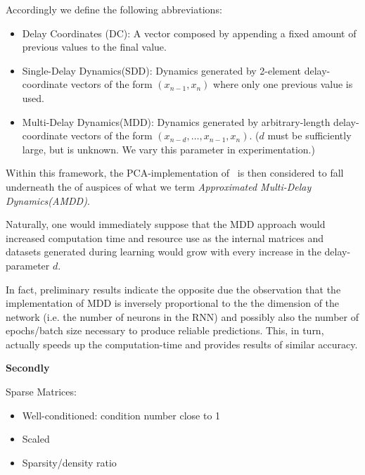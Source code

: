 \documentclass[a4paper,12pt,twoside]{report}
\begin{document}
Accordingly we define the following abbreviations:
\begin{itemize}
  \item Delay Coordinates (DC): A vector composed by appending a fixed amount of previous values to the final value.
  \item Single-Delay Dynamics(SDD): Dynamics generated by 2-element delay-coordinate vectors of the form $(x_{n-1}, x_n)$ where only one previous value is used.
  \item Multi-Delay Dynamics(MDD): Dynamics generated by arbitrary-length delay-coordinate vectors of the form $(x_{n-d}, \ldots , x_{n-1}, x_{n})$. ($d$ must be sufficiently large, but is unknown. We vary this parameter in experimentation.)
\end{itemize}

Within this framework, the PCA-implementation of~\cite{manjunath2021universal} is then considered to fall underneath the of auspices of what we term \emph{Approximated Multi-Delay Dynamics(AMDD)}.


Naturally, one would immediately suppose that the MDD approach would increased computation time and resource use as the internal matrices and datasets generated during learning would grow with every increase in the delay-parameter $d$. 

In fact, preliminary results indicate the opposite due the observation that the implementation of MDD is inversely proportional to the the dimension of the network (i.e. the number of neurons in the RNN) and possibly also the number of epochs/batch size necessary to produce reliable predictions. 
This, in turn, actually speeds up the computation-time and provides results of similar accuracy. 

\textbf{Secondly}

Sparse Matrices:
\vspace{-8mm}
\begin{itemize}[noitemsep]
\item Well-conditioned: condition number close to 1
\item Scaled
\item Sparsity/density ratio
\end{itemize}
\end{document}
